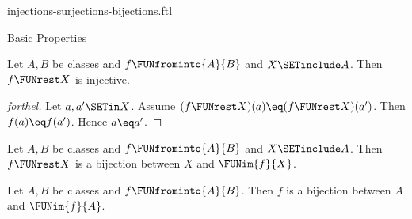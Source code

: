 \documentclass{naproche-library}
\begin{document}
\begin{smodule}[title={Injective, Surjective and Bijective Maps}]{injections-surjections-bijections.ftl}
\begin{sfragment}{Basic Properties}
  \begin{proposition}[forthel,id=FOUNDATIONS_08_2621531811217408]
    Let $A, B$ be classes and $f \FUNfrominto{A}{B}$ and $X \SETinclude A$.
    Then $f \FUNrest X$ is injective.
  \end{proposition}
  \begin{proof}[forthel]
    Let $a, a' \SETin X$.
    Assume $(f \FUNrest X)(a) \eq (f \FUNrest X)(a')$.
    Then $f(a) \eq f(a')$.
    Hence $a \eq a'$.
  \end{proof}

  \begin{proposition}[forthel,id=FOUNDATIONS_08_647446231252992]
    Let $A, B$ be classes and $f \FUNfrominto{A}{B}$ and $X \SETinclude A$.
    Then $f \FUNrest X$ is a bijection between $X$ and $\FUNim{f}{X}$.
  \end{proposition}

  \begin{corollary}[forthel,id=FOUNDATIONS_08_8159443759923200]
    Let $A, B$ be classes and $f \FUNfrominto{A}{B}$.
    Then $f$ is a bijection between $A$ and $\FUNim{f}{A}$.
  \end{corollary}
\end{sfragment}
\end{smodule}
\end{document}
